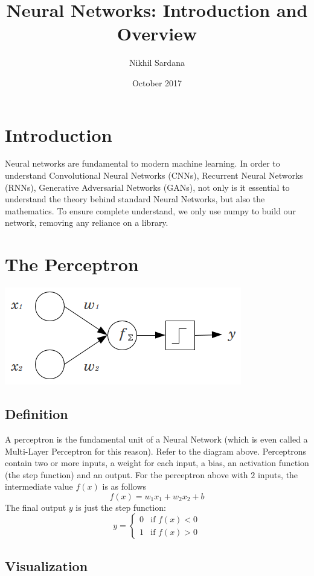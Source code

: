 \documentclass{article}
\title{Neural Networks: Introduction and Overview}
\author{ Nikhil Sardana }
\date{October 2017}
\begin{document}
\maketitle

\section{Introduction}

Neural networks are fundamental to modern machine learning. In order to understand Convolutional Neural Networks (CNNs), Recurrent Neural Networks (RNNs), Generative Adversarial Networks (GANs), not only is it essential to understand the theory behind standard Neural Networks, but also the mathematics. To ensure complete understand, we only use numpy to build our network, removing any reliance on a library.

\section{The Perceptron}
\begin{center}
\includegraphics[scale=0.5]{2MVdW}
\end{center}
\subsection{Definition}

A perceptron is the fundamental unit of a Neural Network (which is even called a Multi-Layer Perceptron for this reason). Refer to the diagram above. Perceptrons contain two or more inputs, a weight for each input, a bias, an activation function (the step function) and an output.
For the perceptron above with $2$ inputs, the intermediate value $f(x)$ is as follows
\[f(x) = w_1x_1 + w_2x_2 + b\]
The final output $y$ is just the step function:
\[
  y =
  \begin{cases}
                                   0 & \text{if $f(x) < 0$} \\
  1 & \text{if $f(x) > 0$}
  \end{cases}
\]
\subsection{Visualization}
\end{document}
